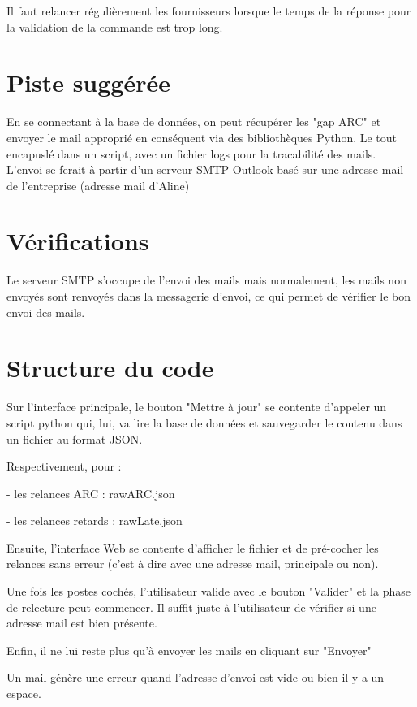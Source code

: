 {Il faut relancer régulièrement les fournisseurs lorsque le temps de la réponse pour la validation de la commande est trop long.

\section{Piste suggérée}

En se connectant à la base de données, on peut récupérer les "gap ARC" et envoyer le mail approprié en conséquent via des bibliothèques Python. Le tout encapuslé dans un script, avec un fichier logs pour la tracabilité des mails.\\

L’envoi se ferait à partir d’un serveur SMTP Outlook basé sur une adresse mail de l’entreprise (adresse mail d'Aline)

\section{Vérifications}

Le serveur SMTP s’occupe de l’envoi des mails mais normalement, les mails non envoyés sont renvoyés dans la messagerie d’envoi, ce qui permet de vérifier le bon envoi des mails.




\section{Structure du code}

Sur l'interface principale, le bouton "Mettre à jour" se contente d'appeler un script python qui, lui, va lire la base de données et sauvegarder le contenu dans un fichier au format JSON.

Respectivement, pour :


- les relances ARC : rawARC.json

- les relances retards : rawLate.json


Ensuite, l'interface Web se contente d'afficher le fichier et de pré-cocher les relances sans erreur (c'est à dire avec une adresse mail, principale ou non).

Une fois les postes cochés, l'utilisateur valide avec le bouton "Valider" et la phase de relecture peut commencer. Il suffit juste à l'utilisateur de vérifier si une adresse mail est bien présente.

Enfin, il ne lui reste plus qu'à envoyer les mails en cliquant sur "Envoyer"

Un mail génère une erreur quand l'adresse d'envoi est vide ou bien il y a un espace. %

}
